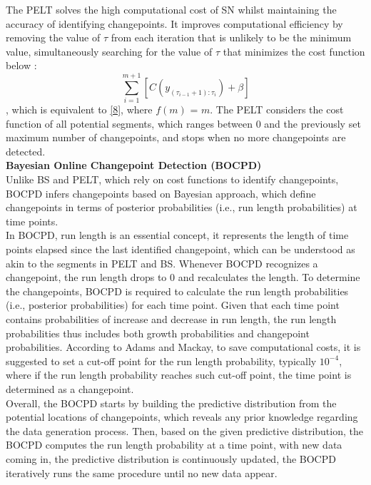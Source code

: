 \documentclass[]{interact}
\theoremstyle{plain}%
\theoremstyle{definition}
\theoremstyle{remark}
\begin{document}
The PELT solves the high computational cost of SN whilst maintaining the accuracy of identifying changepoints. It improves computational efficiency by removing the value of $\tau$ from each iteration that is unlikely to be the minimum value, simultaneously searching for the value of $\tau$ that minimizes the cost function below \cite{killickOptimalDetectionChangepoints2012}:
\begin{equation} \label{10}
	\sum_{i = 1} ^{m + 1} \left[C(y_{({\tau_{i-1} + 1}):\tau_{i}}) + \beta \right]
\end{equation}
, which is equivalent to \eqref{8}, where $f(m)$ = $m$. The PELT considers the cost function of all potential segments, which ranges between 0 and the previously set maximum number of changepoints, and stops when no more changepoints are detected.\\

\hspace{-0.55cm} \textbf{Bayesian Online Changepoint Detection (BOCPD)}\\

Unlike BS and PELT, which rely on cost functions to identify changepoints, BOCPD infers changepoints based on Bayesian approach, which define changepoints in terms of posterior probabilities (i.e., run length probabilities) at time points. \\

In BOCPD, run length is an essential concept, it represents the length of time points elapsed since the last identified changepoint, which can be understood as akin to the segments in PELT and BS. Whenever BOCPD recognizes a changepoint, the run length drops to 0 and recalculates the length. To determine the changepoints, BOCPD is required to calculate the run length probabilities (i.e., posterior probabilities) for each time point. Given that each time point contains probabilities of increase and decrease in run length, the run length probabilities thus includes both growth probabilities and changepoint probabilities. According to Adams and Mackay\cite{adamsBayesianOnlineChangepoint2007}, to save computational costs, it is suggested to set a cut-off point for the run length probability, typically $10^{-4}$, where if the run length probability reaches such cut-off point, the time point is determined as a changepoint. \\

Overall, the BOCPD starts by building the predictive distribution from the potential locations of changepoints, which reveals any prior knowledge regarding the data generation process. Then, based on the given predictive distribution, the BOCPD computes the run length probability at a time point, with new data coming in, the predictive distribution is continuously updated, the BOCPD iteratively runs the same procedure until no new data appear. \\
\end{document}
